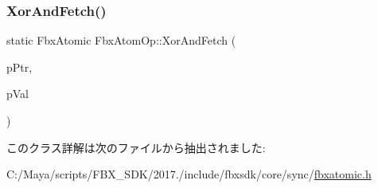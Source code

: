 \mbox{\label{class_fbx_atom_op_a25b6645fecbc0bb11c46bb19afeb262a}} 
\subsubsection{\texorpdfstring{Xor\+And\+Fetch()}{XorAndFetch()}}
{\footnotesize\ttfamily static Fbx\+Atomic Fbx\+Atom\+Op\+::\+Xor\+And\+Fetch (\begin{DoxyParamCaption}\item[{volatile Fbx\+Atomic $\ast$}]{p\+Ptr,  }\item[{Fbx\+Atomic}]{p\+Val }\end{DoxyParamCaption})\hspace{0.3cm}{\ttfamily [static]}}



このクラス詳解は次のファイルから抽出されました\+:\begin{DoxyCompactItemize}
\item 
C\+:/\+Maya/scripts/\+F\+B\+X\+\_\+\+S\+D\+K/2017./include/fbxsdk/core/sync/\hyperlink{fbxatomic_8h}{fbxatomic.\+h}\end{DoxyCompactItemize}
